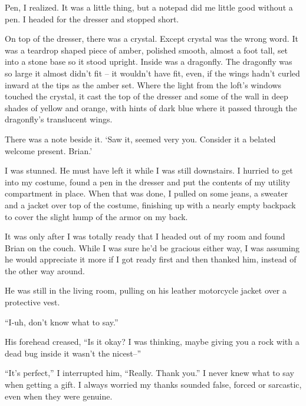 Pen, I realized.  It was a little thing, but a notepad did me little good without a pen.  I headed for the dresser and stopped short.



On top of the dresser, there was a crystal.  Except crystal was the wrong word.  It was a teardrop shaped piece of amber, polished smooth, almost a foot tall, set into a stone base so it stood upright.  Inside was a dragonfly.  The dragonfly was so large it almost didn't fit – it wouldn't have fit, even, if the wings hadn't curled inward at the tips as the amber set.  Where the light from the loft's windows touched the crystal, it cast the top of the dresser and some of the wall in deep shades of yellow and orange, with hints of dark blue where it passed through the dragonfly's translucent wings.



There was a note beside it.  `Saw it, seemed very you.  Consider it a belated welcome present.  Brian.'



I was stunned.  He must have left it while I was still downstairs.  I hurried to get into my costume, found a pen in the dresser and put the contents of my utility compartment in place.  When that was done, I pulled on some jeans, a sweater and a jacket over top of the costume, finishing up with a nearly empty backpack to cover the slight hump of the armor on my back.



It was only after I was totally ready that I headed out of my room and found Brian on the couch.  While I was sure he'd be gracious either way, I was assuming he would appreciate it more if I got ready first and then thanked him, instead of the other way around.



He was still in the living room, pulling on his leather motorcycle jacket over a protective vest.



``I-uh, don't know what to say.''



His forehead creased, ``Is it okay?  I was thinking, maybe giving you a rock with a dead bug inside it wasn't the nicest--''



``It's perfect,'' I interrupted him, ``Really.  Thank you.''  I never knew what to say when getting a gift.  I always worried my thanks sounded false, forced or sarcastic, even when they were genuine.



